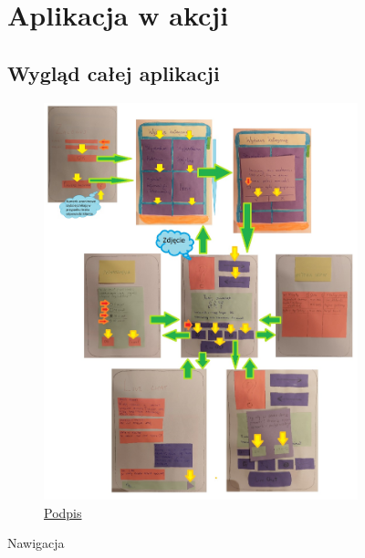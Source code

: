\documentclass[12pt]{article}
\begin{document}
\begin{figure}[h!]
	\section {Aplikacja w akcji}
	\subsection{Wygląd całej aplikacji}
	\centering
	\begin{subfigure}[b]{1\linewidth}
		\includegraphics[width=\linewidth]{zdj/mozaika.jpg}
		\caption{\underline{Podpis}}
	\end{subfigure}
	\label{fig:nuty}
	\caption{Nawigacja}
\end{figure}

\clearpage
\end{document}
